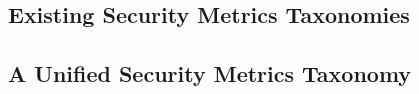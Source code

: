 




\subsection{Existing Security Metrics Taxonomies}\label{sec:background:existing_metrics_taxonomies}



\subsection{A Unified Security Metrics Taxonomy}\label{sec:background:metrics_by_cybok}




% 




% 

% 